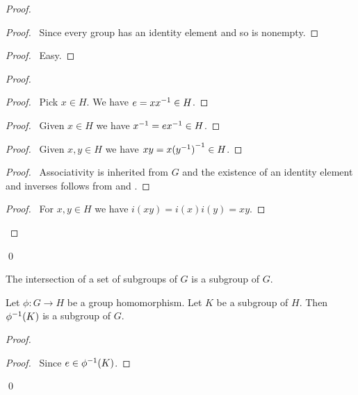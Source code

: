 \begin{proof}
\pf
{}
\begin{proof}
\pf\ Since every group has an identity element and so is nonempty.
\end{proof}
\begin{proof}
\pf\ Easy.
\end{proof}
\begin{proof}
	\begin{proof}
		\pf\ Pick $x \in H$. We have $e = x {x}^{-1} \in H$.
	\end{proof}
	\begin{proof}
		\pf\ Given $x \in H$ we have ${x}^{-1} = e {x}^{-1} \in H$.
	\end{proof}
	\begin{proof}
		\pf\ Given $x,y \in H$ we have $xy = x {({y}^{-1})}^{-1} \in H$.
	\end{proof}
	\begin{proof}
		\pf\ Associativity is inherited from $G$ and the existence of an identity element and inverses follows from  and .
	\end{proof}
	\begin{proof}
		\pf\ For $x,y \in H$ we have $i(xy) = i(x)i(y) = xy$.
	\end{proof}
\end{proof}
\qed
\end{proof}

\begin{cor}
The intersection of a set of subgroups of $G$ is a subgroup of $G$.
\end{cor}

\begin{cor}
\label{cor:inverse-image-subgroup}
Let $\phi : G \rightarrow H$ be a group homomorphism. Let $K$ be a subgroup of $H$. Then ${\phi}^{-1}(K)$ is a subgroup of $G$.
\end{cor}

\begin{proof}
\pf
{}
\begin{proof}
\pf\ Since $e \in {\phi}^{-1}(K)$.
\end{proof}
\qed
\end{proof}

